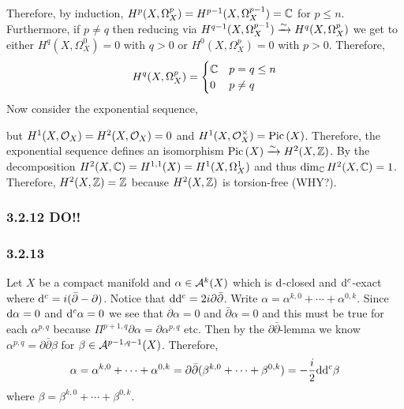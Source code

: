 \documentclass[12pt]{article}
\begin{document}
Therefore, by induction, $H^p(X, \Omega_X^p) = H^{p-1}(X, \Omega_X^{p-1}) = \mathbb{C}$ for $p \le n$. Furthermore, if $p \neq q$ then reducing via $H^{q-1}(X, \Omega^{p-1}_{X}) \xrightarrow{\sim} H^q(X, \Omega^p_{X})$ we get to either $H^q(X, \Omega^0_X) = 0$ with $q > 0$ or $H^0(X, \Omega^p_X) = 0$ with $p > 0$. Therefore,
\[ H^q(X, \Omega^p_X) = 
\begin{cases}
\mathbb{C} & p = q \le n
\\
0 & p \neq q
\end{cases} \]
Now consider the exponential sequence,
\begin{center}
\end{center}
but $H^1(X, \mathcal{O}_{X}) = H^2(X, \mathcal{O}_{X}) = 0$ and $H^1(X, \mathcal{O}_{X}^\times) = \mathrm{Pic} \left( X \right)$. Therefore, the exponential sequence defines an isomorphism $\mathrm{Pic} \left( X \right) \xrightarrow{\sim} H^2(X, \mathbb{Z})$. By the \kahler decomposition $H^2(X, \mathbb{C}) = H^{1,1}(X) = H^1(X, \Omega^1_X)$ and thus $\dim_{\mathbb{C}} H^2(X, \mathbb{C}) = 1$. Therefore, $H^2(X, \mathbb{Z}) = \mathbb{Z}$ because $H^2(X, \mathbb{Z})$ is torsion-free (WHY?). 

\subsubsection{3.2.12 DO!!}

\subsubsection{3.2.13}

Let $X$ be a compact \kahler manifold and $\alpha \in \mathcal{A}^k(X)$ which is $\mathrm{d}$-closed and $\mathrm{d}^c$-exact where $\mathrm{d}^c = i (\bar{\partial} - \partial)$. Notice that $\mathrm{d} \mathrm{d}^c = 2 i \partial \bar{\partial}$. Write $\alpha = \alpha^{k, 0} + \cdots + \alpha^{0, k}$. Since $\mathrm{d}{\alpha} = 0$ and $\mathrm{d}^c{\alpha} = 0$ we see that $\partial \alpha = 0$ and $\bar{\partial} \alpha = 0$ and this must be true for each $\alpha^{p,q}$ because $\Pi^{p+1,q} \partial \alpha = \partial \alpha^{p,q}$ etc. Then by the $\partial \bar{\partial}$-lemma we know $\alpha^{p,q} = \partial \bar{\partial} \beta$ for $\beta \in \mathcal{A}^{p-1,q-1}(X)$. Therefore, 
\[ \alpha = \alpha^{k, 0} + \cdots + \alpha^{0, k} = \partial \bar{\partial} (\beta^{k, 0} + \cdots + \beta^{0, k}) = - \frac{i}{2} \mathrm{d} \mathrm{d}^c \beta \]
where $\beta = \beta^{k, 0} + \cdots + \beta^{0, k}$. 
\end{document}

